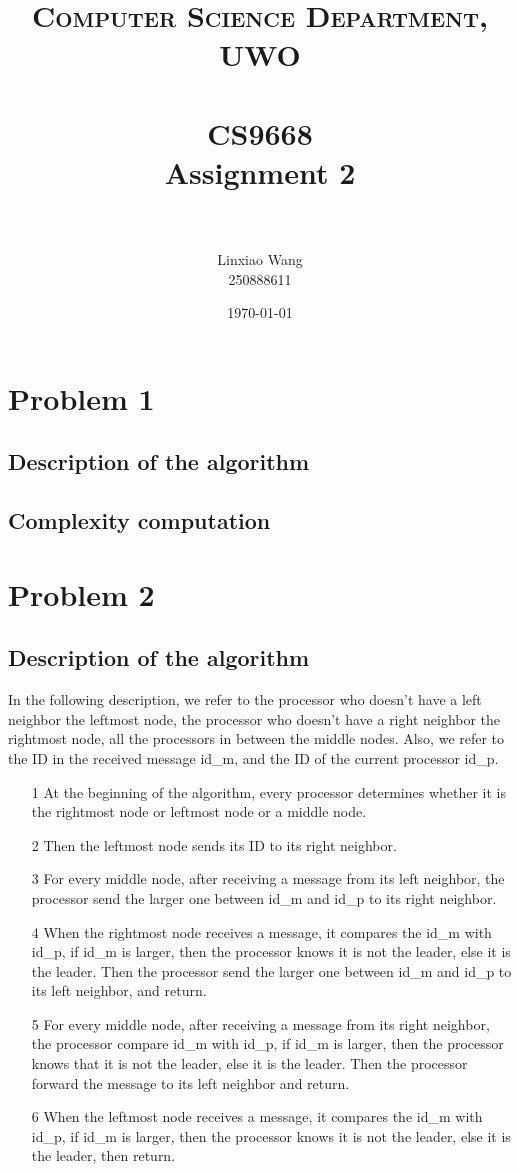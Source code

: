 \documentclass[paper=a4, fontsize=11pt]{scrartcl} %
\title{	
\normalfont \normalsize 
\textsc{Computer Science Department, UWO} \\ [25pt] %
\horrule{0.5pt} \\[0.4cm] %
\huge CS9668\\
Assignment 2 \\ %
\horrule{2pt} \\[0.5cm] %
}
\author{Linxiao Wang\\
	250888611} %
\date{\normalsize\today} %
\numberwithin{equation}{section} %
\numberwithin{figure}{section} %
\numberwithin{table}{section} %
\begin{document}
\maketitle %


\section*{Problem 1}
\subsection*{Description of the algorithm}

\subsection*{Complexity computation}

\section*{Problem 2}
\subsection*{Description of the algorithm}
In the following description, we refer to the processor who doesn't have a left neighbor the leftmost node, the processor who doesn't have a right neighbor the rightmost node, all the processors in between the middle nodes. Also, we refer to the ID in the received message id\_m, and the ID of the current processor id\_p.
\begin{itemize}
	\item[1] At the beginning of the algorithm, every processor determines whether it is the rightmost node or leftmost node or a middle node.

	\item[2] Then the leftmost node sends its ID to its right neighbor.

	\item[3] For every middle node, after receiving a message from its left neighbor, the processor send the larger one between id\_m and id\_p to its right neighbor.
	\item[4] When the rightmost node receives a message, it compares the id\_m with id\_p, if id\_m is larger, then the processor knows it is not the leader, else it is the leader. Then the processor send the larger one between id\_m and id\_p to its left neighbor, and return.
	\item[5] For every middle node, after receiving a message from its right neighbor, the processor compare id\_m with id\_p, if id\_m is larger, then the processor knows that it is not the leader, else it is the leader. Then the processor forward the message to its left neighbor and return.
	\item[6] When the leftmost node receives a message, it compares the id\_m with id\_p, if id\_m is larger, then the processor knows it is not the leader, else it is the leader, then return.
\end{itemize}
\end{document}
